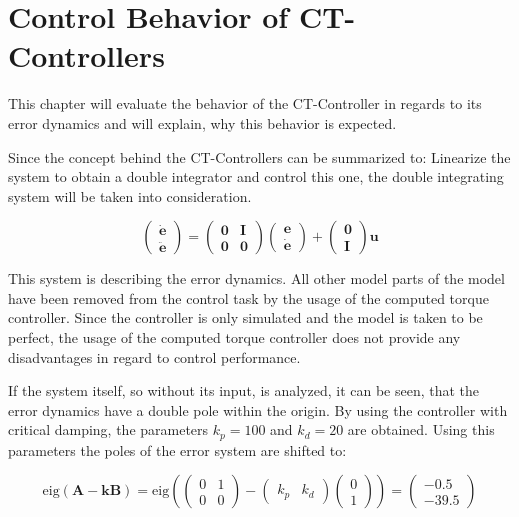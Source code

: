 \renewcommand{\thepage}{\arabic{page}} \setcounter{page}{1}

\chapter{Control Behavior of CT-Controllers}

This chapter will evaluate the behavior of the CT-Controller in regards to its error dynamics and will explain, why this behavior is expected.


Since the concept behind the CT-Controllers can be summarized to: Linearize the system to obtain a double integrator and control this one, the double integrating system will be taken into consideration.

\begin{equation*}
\left(\begin{array}{c}
\dot{\mathbf{e}} \\ \ddot{\mathbf{e}}
\end{array}\right) = \left(\begin{array}{cc}
\mathbf{0} & \mathbf{I} \\
\mathbf{0} & \mathbf{0} 
\end{array}\right) \left(\begin{array}{c}
\mathbf{e} \\ \dot{\mathbf{e}}
\end{array}\right) + \left(\begin{array}{c}
\mathbf{0} \\ \mathbf{I}
\end{array}\right) \mathbf{u}
\end{equation*}

This system is describing the error dynamics. All other model parts of the model have been removed from the control task by the usage of the computed torque controller. Since the controller is only simulated and the model is taken to be perfect, the usage of the computed torque controller does not provide any disadvantages in regard to control performance.

If the system itself, so without its input, is analyzed, it can be seen, that the error dynamics have a double pole within the origin. By using the controller with critical damping, the parameters $k_p = 100$ and $k_d = 20$ are obtained. Using this parameters the poles of the error system are shifted to:

\begin{equation*}
\text{eig} \left( \mathbf{A} - \mathbf{ k B} \right) = \text{eig} \left(
\left( \begin{array}{cc}0 & 1 \\ 0 & 0\end{array} \right) -
\left( \begin{array}{cc } k_p & k_d \end{array} \right) \left( \begin{array}{c} 0\\1 \end{array} \right) \right)  = \left( \begin{array}{c} -0.5 \\ -39.5 \end{array} \right)
\end{equation*}

